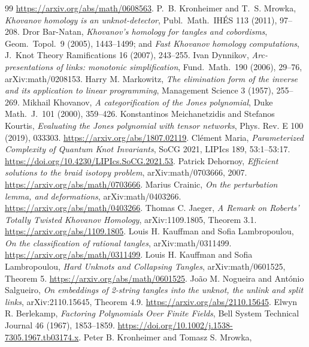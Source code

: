 \documentclass[11pt]{article}
\theoremstyle{remark}
\begin{document}
\begin{thebibliography}{99}
\url{https://arxiv.org/abs/math/0608563}.
 P.~B. Kronheimer and T.~S. Mrowka, \emph{Khovanov homology is an unknot-detector}, Publ.\ Math.\ IH\'ES 113 (2011), 97--208.
 Dror Bar-Natan, \emph{Khovanov's homology for tangles and cobordisms}, Geom.\ Topol.\ 9 (2005), 1443--1499; and \emph{Fast Khovanov homology computations}, J.\ Knot Theory Ramifications 16 (2007), 243--255.
 Ivan Dynnikov, \emph{Arc-presentations of links: monotonic simplification}, Fund.\ Math.\ 190 (2006), 29--76, arXiv:math/0208153.
 Harry M. Markowitz, \emph{The elimination form of the inverse and its application to linear programming}, Management Science 3 (1957), 255--269.
 Mikhail Khovanov, \emph{A categorification of the Jones polynomial}, Duke Math.\ J.\ 101 (2000), 359--426.
 Konstantinos Meichanetzidis and Stefanos Kourtis,
\emph{Evaluating the Jones polynomial with tensor networks},
Phys. Rev. E 100 (2019), 033303. \url{https://arxiv.org/abs/1807.02119}.
 Cl\'ement Maria,
\emph{Parameterized Complexity of Quantum Knot Invariants}, SoCG 2021,
LIPIcs 189, 53:1--53:17. \url{https://doi.org/10.4230/LIPIcs.SoCG.2021.53}.
 Patrick Dehornoy, \emph{Efficient solutions to the braid isotopy problem}, arXiv:math/0703666, 2007. \url{https://arxiv.org/abs/math/0703666}.
 Marius Crainic,
\emph{On the perturbation lemma, and deformations}, arXiv:math/0403266.
\url{https://arxiv.org/abs/math/0403266}.
 Thomas C. Jaeger,
\emph{A Remark on Roberts' Totally Twisted Khovanov Homology},
arXiv:1109.1805, Theorem 3.1. \url{https://arxiv.org/abs/1109.1805}.
 Louis H. Kauffman and Sofia Lambropoulou,
\emph{On the classification of rational tangles}, arXiv:math/0311499.
\url{https://arxiv.org/abs/math/0311499}.
 Louis H. Kauffman and Sofia Lambropoulou,
\emph{Hard Unknots and Collapsing Tangles}, arXiv:math/0601525, Theorem 5.
\url{https://arxiv.org/abs/math/0601525}.
 Jo\~ao M. Nogueira and Ant\'onio Salgueiro,
\emph{On embeddings of 2-string tangles into the unknot, the unlink and split links},
arXiv:2110.15645, Theorem 4.9. \url{https://arxiv.org/abs/2110.15645}.
 Elwyn R. Berlekamp,
\emph{Factoring Polynomials Over Finite Fields}, Bell System Technical Journal
46 (1967), 1853--1859.
\url{https://doi.org/10.1002/j.1538-7305.1967.tb03174.x}.
 Peter B. Kronheimer and Tomasz S. Mrowka,

\end{thebibliography}
\end{document}
